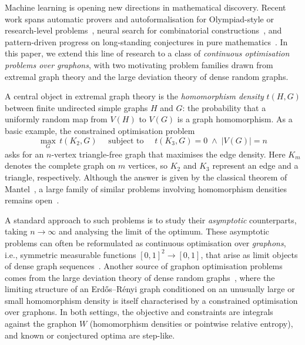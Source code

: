 \documentclass{article}
\theoremstyle{plain}
\theoremstyle{definition}
\theoremstyle{remark}
\begin{document}
\begin{NoHyper}
Machine learning is opening new directions in mathematical discovery. Recent work spans automatic provers and autoformalisation for Olympiad-style or research-level problems~\citep{polu2023formal, trinh2024solving, jiang2023draft, wu2022autoformalization, hubert2026olympiad, huang2025winning,alexeev2026primitive}, neural search for combinatorial constructions~\citep{wagner2021constructions, charton2024patternboost, romera2024mathematical, novikov2025alphaevolve}, and pattern-driven progress on long-standing conjectures in pure mathematics~\citep{davies2021advancing, he2025murmurations}. In this paper, we extend this line of research to a class of \emph{continuous optimisation problems over graphons}, with two motivating problem families drawn from extremal graph theory and the large deviation theory of dense random graphs.
\end{NoHyper}

A central object in extremal graph theory is the \emph{homomorphism density} $t(H, G)$ between finite undirected simple graphs $H$ and $G$: the probability that a uniformly random map from $V(H)$ to $V(G)$ is a graph homomorphism. As a basic example, the constrained optimisation problem
\begin{equation}
  \max_G\, t(K_2, G)
  \quad\text{ subject to }\quad
  t(K_3, G) = 0 \;\land\; |V(G)| = n
  \label{eqn:mantel}
\end{equation}
asks for an $n$-vertex triangle-free graph that maximises the edge density. Here $K_m$ denotes the complete graph on $m$ vertices, so 
$K_2$ and $K_3$ represent an edge and a triangle, respectively. Although the answer is given by the classical theorem of Mantel~\citep{mantel1907vraagstuk}, a large family of similar problems involving homomorphism densities remains open~\citep{sidorenko1993correlation, borgs2006counting}.

A standard approach to such problems is to study their \emph{asymptotic} counterparts, taking $n \to \infty$ and analysing the limit of the optimum. These asymptotic problems can often be reformulated as continuous optimisation over \emph{graphons}, i.e., symmetric measurable functions $[0,1]^2 \to [0,1]$, that arise as limit objects of dense graph sequences~\citep{lovasz2006limits, lovasz2012large}. Another source of graphon optimisation problems comes from the large deviation theory of dense random graphs~\citep{chatterjee2011large}, where the limiting structure of an Erd\H{o}s--R\'enyi graph conditioned on an unusually large or small homomorphism density is itself characterised by a constrained optimisation over graphons. In both settings, the objective and constraints are integrals against the graphon $W$ (homomorphism densities or pointwise relative entropy), and known or conjectured optima are step-like.
\end{document}

